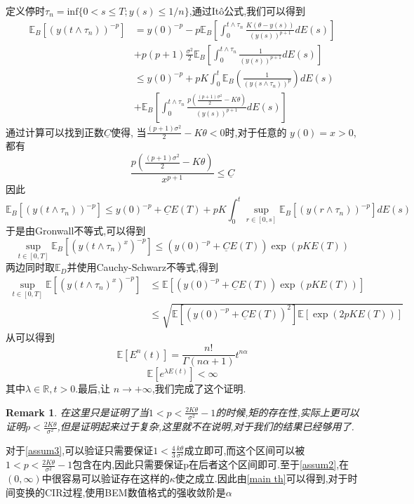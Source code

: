 \documentclass[12pt,final]{article}
\makeatletter
\theoremstyle{plain}
\renewcommand{\proofname}{Proof}
\theoremstyle{Definition}
\theoremstyle{Remark}
\newtheorem{Remark}[Theorem]{Remark}      %
\renewenvironment{proof}[1][\proofname]{\par
	\pushQED{\qed}%
	\normalfont \topsep6\p@\@plus6\p@\relax
	\trivlist\item[\hskip\labelsep
	\bfseries #1\@addpunct{\,:\,}]\ignorespaces
}{%
	\popQED\endtrivlist\@endpefalse
}
\makeatother
\begin{document}
	\begin{proof}
		定义停时$\tau_{n}=\mathrm{inf}\{0<s\leq T;y(s)\leq1/n\}$,通过It\^{o}公式,我们可以得到
		$$\begin{aligned}
			\mathbb{E}_B\left[(y(t\wedge\tau_{n}))^{-p}\right] &=y(0)^{-p}-p\mathbb{E}_B\left[\int_{0}^{t\wedge\tau_{n}}\frac{K(\theta-y(s))}{(y(s))^{p+1}}dE(s)\right]\\
			&+p(p+1)\frac{\sigma^{2}}{2}\mathbb{E}_B\left[\int_{0}^{t\wedge\tau_{n}}\frac{1}{(y(s))^{p+1}}dE(s)\right] \\
			&\leq y(0)^{-p}+pK\int_{0}^{t}\mathbb{E}_B\left(\frac{1}{(y(s\wedge\tau_{n}))^{p}}
			\right)dE(s) \\
			&+\mathbb{E}_B\left[\int_0^{t\wedge\tau_n}\frac{p\left(\frac{(p+1)\sigma^2}{2}-K\theta\right)}{(y(s))^{p+1}}dE(s)\right]
		\end{aligned}$$
		通过计算可以找到正数$\underline C$使得, 当$\frac{(p+1)\sigma^2}{2}-K\theta<0$时,对于任意的 $y(0)=x>0$,都有
		$$\frac{p\left(\frac{(p+1)\sigma^2}{2}-K\theta\right)}{x^{p+1}}\leq \underline C$$
		因此
		$$\mathbb{E}_B\left[(y(t\wedge\tau_n))^{-p}\right]\leq y(0)^{-p}+\underline{C}E(T)+pK\int_0^t\sup_{r\in[0,s]}\mathbb{E}_B\left[(y(r\wedge\tau_n))^{-p}\right]dE(s)$$
		于是由Gronwall不等式,可以得到
		$$\sup\limits_{t\in[0,T]}\mathbb{E}_B\left[(y(t\wedge\tau_n)^x)^{-p}\right]\leq\left(y(0)^{-p}+\underline{C}E(T)\right)\exp(pKE(T))$$
		两边同时取$\mathbb{E}_D$并使用Cauchy-Schwarz不等式,得到
		$$\begin{aligned}
			\sup\limits_{t\in[0,T]}\mathbb{E}\left[(y(t\wedge\tau_n)^x)^{-p}\right]&\leq\mathbb{E}\left[\left(y(0)^{-p}+\underline{C}E(T)\right)\exp(pKE(T))\right]\\
			&\leq\sqrt{\mathbb{E}\left[\left(y(0)^{-p}+\underline{C}E(T)\right)^2\right]\mathbb{E}\left[\exp(2pKE(T))\right]}
		\end{aligned}$$
		从\cite{jum2014strong}可以得到
		\begin{equation}
			\mathbb{E}[E^n(t)]=\frac{n!}{\Gamma(n\alpha+1)}t^{n\alpha}
		\end{equation}
		\begin{equation}
			\mathbb{E}[e^{\lambda E(t)}]<\infty
		\end{equation}
		其中$\lambda \in \mathbb{R},t>0$.最后,让 $n\to+\infty$,我们完成了这个证明.
	\end{proof}
\begin{Remark}
	在这里只是证明了当$1<p<\frac{2K\theta}{\sigma^2}-1$的时候,矩的存在性,实际上更可以证明$p<\frac{2K\theta}{\sigma^2}$,但是证明起来过于复杂,这里就不在说明,对于我们的结果已经够用了.
\end{Remark}
	对于\cref{assum3},可以验证只需要保证$1 < \frac{4}{3}\frac{k\theta}{\sigma^2}$成立即可,而这个区间可以被$1<p<\frac{2K\theta}{\sigma^2}-1$包含在内,因此只需要保证p在后者这个区间即可.至于\cref{assum2},在$(0,\infty)$中很容易可以验证存在这样的$\kappa$使之成立.因此由\cref{main th}可以得到,对于时间变换的CIR过程,使用BEM数值格式的强收敛阶是$\alpha$
\end{document}
